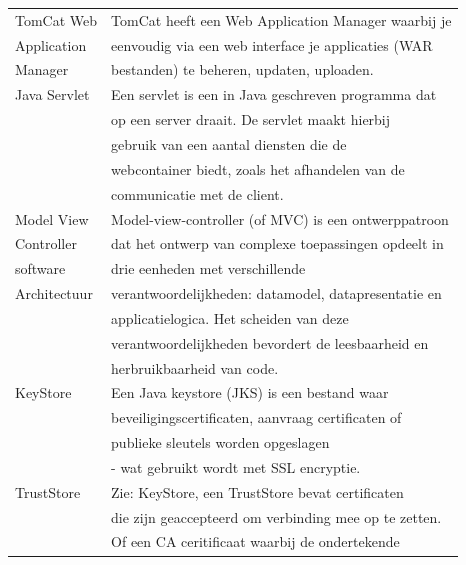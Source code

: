 \documentclass[]{article}
\begin{document}
\begin{longtable}{|| l | l ||}
    TomCat Web       & TomCat heeft een Web Application Manager waarbij je  \\
    Application      & eenvoudig via een web interface je applicaties (WAR  \\
    Manager          & bestanden) te beheren, updaten, uploaden.            \\\hline
    Java Servlet     & Een servlet is een in Java geschreven programma dat  \\
                     & op een server draait. De servlet maakt hierbij       \\
                     & gebruik van een aantal diensten die de               \\
                     & webcontainer biedt, zoals het afhandelen van de      \\
                     & communicatie met de client.                          \\\hline
    Model View       & Model-view-controller (of MVC) is een ontwerppatroon \\
    Controller       & dat het ontwerp van complexe toepassingen opdeelt in \\
    software         & drie eenheden met verschillende                      \\
    Architectuur     & verantwoordelijkheden: datamodel, datapresentatie en \\
                     & applicatielogica. Het scheiden van deze              \\
                     & verantwoordelijkheden bevordert de leesbaarheid en   \\
                     & herbruikbaarheid van code.                           \\\hline
    KeyStore         & Een Java keystore (JKS) is een bestand waar          \\
                     & beveiligingscertificaten, aanvraag certificaten of   \\
                     & publieke sleutels worden opgeslagen                  \\
                     & - wat gebruikt wordt met SSL encryptie.              \\\hline
    TrustStore       & Zie: KeyStore, een TrustStore bevat certificaten     \\
                     & die zijn geaccepteerd om verbinding mee op te zetten.\\
                     & Of een CA ceritificaat waarbij de ondertekende       \\

\end{longtable}
\end{document}
